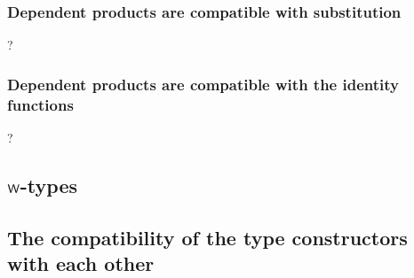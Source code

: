 \subsubsection{Dependent products are compatible with substitution}?
\subsubsection{Dependent products are compatible with the identity functions}?

\subsection{${\mathsf{W}}$-types}

\subsection{The compatibility of the type constructors with each other}
\label{compatibility-of-type-constructors}

\begin{comment}
\section{Intensional algebras for the theory of contexts, families and terms}
In this section we investigate intensional algebras for the theory of contexts,
families and terms. These are algebras in a weak sense: the judgmental
equalities are replaced by propositional equalities and in some cases coherence
properties are added. The goal writing intensional algebras is twofold: first,
it allows for easy formalization in existing proof assistants such as \Coq;
second, we are shooting at an internal definition of internal weak 
$\infty$-groupoids.

\subsection{Intensional extension algebras}

\begin{defn}
An intensional extension algebra in context $\Gamma$ consists of
\begin{enumerate}
\item A type $C$ in context $\Gamma$
\item A type family $F:C\to\type$
\item A function $\epsilon_0:(\sm{x:C}F(x))\to C$.
\item A function $\epsilon_1:\prd{x:C}(\sm{y:F(x)}F(\epsilon_0(x,y)))\to F(x)$
\end{enumerate}
\end{defn}
\end{comment}
